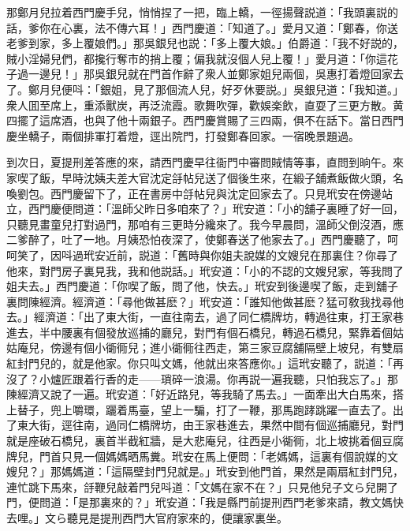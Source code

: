 那鄭月兒拉着西門慶手兒，悄悄捏了一把，臨上轎，一徑揚聲説道：「我頭裏説的話，爹你在心裏，法不傳六耳！」西門慶道：「知道了。」愛月又道：「鄭春，你送老爹到家，多上覆娘們。」那吳銀兒也説：「多上覆大娘。」伯爵道：「我不好説的，賊小淫婦兒們，都攙行奪市的捎上覆；偏我就沒個人兒上覆！」愛月道：「你這花子過一邊兒！」那吳銀兒就在門首作辭了衆人並鄭家姐兒兩個，吳惠打着燈回家去了。鄭月兒便呌：「銀姐，見了那個流人兒，好歹休要説。」吳銀兒道：「我知道。」衆人囬至席上，重添獸炭，再泛流霞。歌舞吹彈，歡娛楽飲，直耍了三更方散。黄四擺了這席酒，也與了他十兩銀子。西門慶賞賜了三四兩，俱不在話下。當日西門慶坐轎子，兩個排軍打着燈，逕出院門，打發鄭春回家。一宿晚景題過。

到次日，夏提刑差答應的來，請西門慶早往衙門中審問賊情等事，直問到晌午。來家喫了飯，早時沈姨夫差大官沈定㧱帖兒送了個後生來，在緞子舖煮飯做火頭，名喚劉包。西門慶留下了，正在書房中㧱帖兒與沈定回家去了。只見玳安在傍邊站立，西門慶便問道：「溫師父昨日多咱來了？」玳安道：「小的舖子裏睡了好一回，只聽見畫童兒打對過門，那咱有三更時分纔來了。我今早晨問，溫師父倒沒酒，應二爹醉了，吐了一地。月姨恐怕夜深了，使鄭春送了他家去了。」西門慶聽了，呵呵笑了，因呌過玳安近前，説道：「舊時與你姐夫說媒的文嫂兒在那裏住？你尋了他來，對門房子裏見我，我和他説話。」玳安道：「小的不認的文嫂兒家，等我問了姐夫去。」西門慶道：「你喫了飯，問了他，快去。」玳安到後邊喫了飯，走到舖子裏問陳經濟。經濟道：「尋他做甚麽？」玳安道：「誰知他做甚麽？猛可敎我找尋他去。」經濟道：「出了東大街，一直往南去，過了同仁橋牌坊，轉過往東，打王家巷進去，半中腰裏有個發放巡捕的廳兒，對門有個石橋兒，轉過石橋兒，緊靠着個姑姑庵兒，傍邊有個小衚衕兒；進小衚衕往西走，第三家豆腐舖隔壁上坡兒，有雙扇紅封門兒的，就是他家。你只叫文媽，他就出來答應你。」這玳安聽了，説道：「再沒了？小爐匠跟着行香的走——瑣碎一浪湯。你再説一遍我聽，只怕我忘了。」那陳經濟又說了一遍。玳安道：「好近路兒，等我騎了馬去。」一面牽出大白馬來，搭上替子，兜上嚼環，躧着馬臺，望上一騙，打了一鞭，那馬跑踍跳躍一直去了。出了東大街，逕往南，過同仁橋牌坊，由王家巷進去，果然中間有個巡捕廳兒，對門就是座破石橋兒，裏首半截紅牆，是大悲庵兒，往西是小衚衕，北上坡挑着個豆腐牌兒，門首只見一個媽媽晒馬糞。玳安在馬上便問：「老媽媽，這裏有個說媒的文嫂兒？」那媽媽道：「這隔壁封門兒就是。」玳安到他門首，果然是兩扇紅封門兒，連忙跳下馬來，㧱鞭兒敲着門兒呌道：「文媽在家不在？」只見他兒子文ら兒開了門，便問道：「是那裏來的？」玳安道：「我是縣門前提刑西門老爹來請，教文媽快去哩。」文ら聽見是提刑西門大官府家來的，便讓家裏坐。

